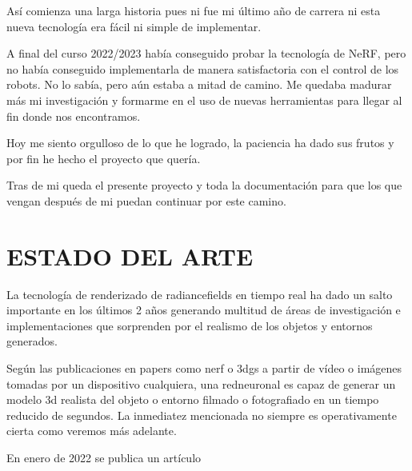 \documentclass[a4paper, 12pt, spanish, twoside]{article}
\begin{document}
Así comienza una larga historia pues ni fue mi último año de carrera ni esta nueva tecnología era fácil ni simple de implementar. 

A final del curso 2022/2023 había conseguido probar la tecnología de NeRF, pero no había conseguido implementarla de manera satisfactoria con el control de los robots. No lo sabía, pero aún estaba a mitad de camino. Me quedaba madurar más mi investigación y formarme en el uso de nuevas herramientas para llegar al fin donde nos encontramos. 

Hoy me siento orgulloso de lo que he logrado, la paciencia ha dado sus frutos y por fin he hecho el proyecto que quería.  

Tras de mi queda el presente proyecto y toda la documentación para que los que vengan después de mi puedan continuar por este camino.  

\clearpage





\newpage
\section{ESTADO DEL ARTE} \label{sec:estado_del_arte}

La tecnología de \gls{renderizado} de \glspl{radiancefield} en tiempo real ha dado un salto importante en los últimos 2 años generando multitud de áreas de investigación e implementaciones que sorprenden por el realismo de los objetos y entornos generados.

Según las publicaciones en papers como \acrfull{nerf} o \acrfull{3dgs} a partir de vídeo o imágenes tomadas por un dispositivo cualquiera, una \gls{redneuronal} es capaz de generar un modelo \acrshort{3d} realista del objeto o entorno filmado o fotografiado en un tiempo reducido de segundos. La inmediatez mencionada no siempre es operativamente cierta como veremos más adelante.



En enero de 2022 se publica un artículo
\end{document}
